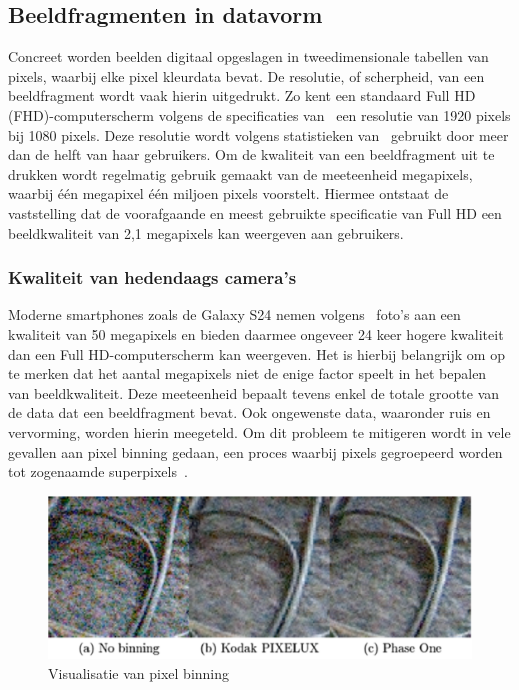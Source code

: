 \subsection{Beeldfragmenten in datavorm}\label{subsec:beeldfragmenten-als-data}
Concreet worden beelden digitaal opgeslagen in tweedimensionale tabellen van pixels, waarbij elke pixel kleurdata bevat.
De resolutie, of scherpheid, van een beeldfragment wordt vaak hierin uitgedrukt.
Zo kent een standaard Full HD (FHD)-computerscherm volgens de specificaties van~\textcite{VESA2013} een resolutie van 1920 pixels bij 1080 pixels.
Deze resolutie wordt volgens statistieken van~\textcite{ValveCorporation2024} gebruikt door meer dan de helft van haar gebruikers.
Om de kwaliteit van een beeldfragment uit te drukken wordt regelmatig gebruik gemaakt van de meeteenheid megapixels, waarbij \'e\'en megapixel \'e\'en miljoen pixels voorstelt.
Hiermee ontstaat de vaststelling dat de voorafgaande en meest gebruikte specificatie van Full HD een beeldkwaliteit van 2,1 megapixels kan weergeven aan gebruikers.

\subsubsection{Kwaliteit van hedendaags camera's}
Moderne smartphones zoals de Galaxy S24 nemen volgens~\textcite{Samsung2024} foto's aan een kwaliteit van 50 megapixels en bieden daarmee ongeveer 24 keer hogere kwaliteit dan een Full HD-computerscherm kan weergeven.
Het is hierbij belangrijk om op te merken dat het aantal megapixels niet de enige factor speelt in het bepalen van beeldkwaliteit.
Deze meeteenheid bepaalt tevens enkel de totale grootte van de data dat een beeldfragment bevat.
Ook ongewenste data, waaronder ruis en vervorming, worden hierin meegeteld.
Om dit probleem te mitigeren wordt in vele gevallen aan pixel binning gedaan, een proces waarbij pixels gegroepeerd worden tot zogenaamde superpixels~\autocite{Jin2012}.
\begin{figure}
    \includegraphics[width=1\linewidth]{images/pixel-binning}
    \caption{Visualisatie van pixel binning~\autocite{Jin2012}}
    \label{fig:pixel-binning}
\end{figure}

